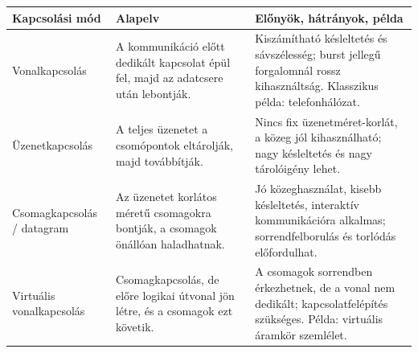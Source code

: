 \begin{tabularx}{\textwidth}{L{31mm}L{32mm}X}
\toprule
\textbf{Kapcsolási mód} & \textbf{Alapelv} & \textbf{Előnyök, hátrányok, példa} \\
\midrule
Vonalkapcsolás & A kommunikáció előtt dedikált kapcsolat épül fel, majd az adatcsere után lebontják. & Kiszámítható késleltetés és sávszélesség; burst jellegű forgalomnál rossz kihasználtság. Klasszikus példa: telefonhálózat. \\
Üzenetkapcsolás & A teljes üzenetet a csomópontok eltárolják, majd továbbítják. & Nincs fix üzenetméret-korlát, a közeg jól kihasználható; nagy késleltetés és nagy tárolóigény lehet. \\
Csomagkapcsolás / datagram & Az üzenetet korlátos méretű csomagokra bontják, a csomagok önállóan haladhatnak. & Jó közeghasználat, kisebb késleltetés, interaktív kommunikációra alkalmas; sorrendfelborulás és torlódás előfordulhat. \\
Virtuális vonalkapcsolás & Csomagkapcsolás, de előre logikai útvonal jön létre, és a csomagok ezt követik. & A csomagok sorrendben érkezhetnek, de a vonal nem dedikált; kapcsolatfelépítés szükséges. Példa: virtuális áramkör szemlélet. \\
\bottomrule
\end{tabularx}
